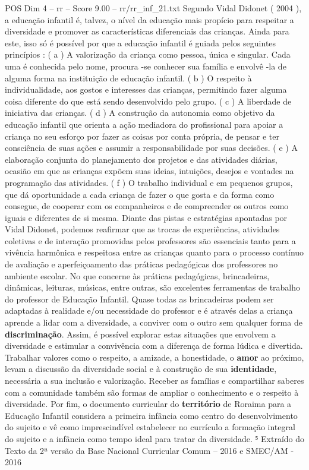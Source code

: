 \begin{textsample}{POS Dim 4 – rr – Score 9.00 – rr/rr\_inf\_21.txt}
Segundo Vidal Didonet ( 2004 ), a educação infantil é, talvez, o nível da educação mais propício para respeitar a diversidade e promover as características diferenciais das crianças.
Ainda para este, isso só é possível por que a educação infantil é guiada pelos seguintes princípios : ( a ) A valorização da criança como pessoa, única e singular.
Cada uma é conhecida pelo nome, procura -se conhecer sua família e envolvê -la de alguma forma na instituição de educação infantil. ( b ) O respeito à individualidade, aos gostos e interesses das crianças, permitindo fazer alguma coisa diferente do que está sendo desenvolvido pelo grupo. ( c ) A liberdade de iniciativa das crianças. ( d ) A construção da autonomia como objetivo da educação infantil que orienta a ação mediadora do profissional para apoiar a criança no seu esforço por fazer as coisas por conta própria, de pensar e ter consciência de suas ações e assumir a responsabilidade por suas decisões. ( e ) A elaboração conjunta do planejamento dos projetos e das atividades diárias, ocasião em que as crianças expõem suas ideias, intuições, desejos e vontades na programação das atividades. ( f ) O trabalho individual e em pequenos grupos, que dá oportunidade a cada criança de fazer o que gosta e da forma como consegue, de cooperar com os companheiros e de compreender os outros como iguais e diferentes de si mesma.
Diante das pistas e estratégias apontadas por Vidal Didonet, podemos reafirmar que as trocas de experiências, atividades coletivas e de interação promovidas pelos professores são essenciais tanto para a vivência harmônica e respeitosa entre as crianças quanto para o processo contínuo de avaliação e aperfeiçoamento das práticas pedagógicas dos professores no ambiente escolar.
No que concerne às práticas pedagógicas, brincadeiras, dinâmicas, leituras, músicas, entre outras, são excelentes ferramentas de trabalho do professor de Educação Infantil.
Quase todas as brincadeiras podem ser adaptadas à realidade e/ou necessidade do professor e é através delas a criança aprende a lidar com a diversidade, a conviver com o outro sem qualquer forma de \textbf{discriminação}.
Assim, é possível explorar estas situações que envolvem a diversidade e estimular a convivência com a diferença de forma lúdica e divertida.
Trabalhar valores como o respeito, a amizade, a honestidade, o \textbf{amor} ao próximo, levam a discussão da diversidade social e à construção de sua \textbf{identidade}, necessária a sua inclusão e valorização.
Receber as famílias e compartilhar saberes com a comunidade também são formas de ampliar o conhecimento e o respeito à diversidade.
Por fim, o documento curricular do \textbf{território} de Roraima para a Educação Infantil considera a primeira infância como centro do desenvolvimento do sujeito e vê como imprescindível estabelecer no currículo a formação integral do sujeito e a infância como tempo ideal para tratar da diversidade. ⁵ Extraído do Texto da 2ª versão da Base Nacional Curricular Comum – 2016 e SMEC/AM - 2016

\end{textsample}
